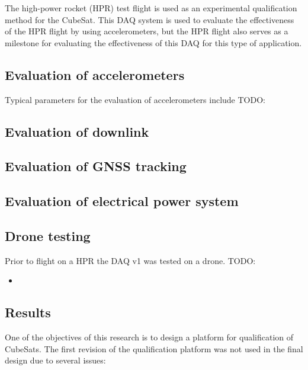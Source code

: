 \documentclass[draft]{report}
\begin{document}
The high-power rocket (HPR) test flight is used as an experimental qualification method for the CubeSat. This DAQ system is used to evaluate the effectiveness of the HPR flight by using accelerometers, but the HPR flight also serves as a milestone for evaluating the effectiveness of this DAQ for this type of application.

\subsection{Evaluation of accelerometers}

Typical parameters for the evaluation of accelerometers include TODO:

\subsection{Evaluation of downlink}

\subsection{Evaluation of GNSS tracking}

\subsection{Evaluation of electrical power system}

\subsection{Drone testing}
Prior to flight on a HPR the DAQ v1 was tested on a drone.
TODO:

\begin{itemize}
  \item
\end{itemize}

\subsection{Results}

One of the objectives of this research is to design a platform for qualification of CubeSats. The first revision of the qualification platform was not used in the final design due to several issues:
\end{document}
